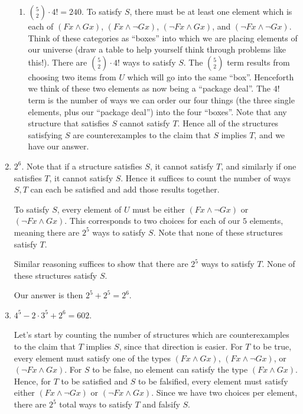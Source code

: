\begin{mdframed}[linewidth=1]
\begin{enumerate}
\begin{enumerate}
        \item $\binom{5}{2}\cdot 4! = 240$. To satisfy $S$, there must be at least one element which is each of $(Fx \land Gx)$, $(Fx \land \lnot Gx)$, $(\lnot Fx \land Gx)$, and $(\lnot Fx \land \lnot Gx)$. Think of these categories as ``boxes'' into which we are placing elements of our universe (draw a table to help yourself think through problems like this!). There are $\binom{5}{2}\cdot 4!$ ways to satisfy $S$. The $\binom{5}{2}$ term results from choosing two items from $U$ which will go into the same ``box''. Henceforth we think of these two elements as now being a ``package deal''. The $4!$ term is the number of ways we can order our four things (the three single elements, plus our ``package deal'') into the four ``boxes''. Note that any structure that satisfies $S$ cannot satisfy $T$. Hence all of the structures satisfying $S$ are counterexamples to the claim that $S$ implies $T$, and we have our answer. 
    \end{enumerate}

    \item $2^6$. Note that if a structure satisfies $S$, it cannot satisfy $T$, and similarly if one satisfies $T$, it cannot satisfy $S$. Hence it suffices to count the number of ways $S, T$ can each be satisfied and add those results together.

    To satisfy $S$, every element of $U$ must be either $(Fx \land \lnot Gx)$ or $(\lnot Fx \land Gx)$. This corresponds to two choices for each of our $5$ elements, meaning there are $2^5$ ways to satisfy $S$. Note that none of these structures satisfy $T$.

    Similar reasoning suffices to show that there are $2^5$ ways to satisfy $T$. None of these structures satisfy $S$.

    Our answer is then $2^5 + 2^5 = 2^6$. 

    \item $4^5 - 2\cdot 3^5 + 2^6 = 602$. 

    Let's start by counting the number of structures which are counterexamples to the claim that $T$ implies $S$, since that direction is easier. For $T$ to be true, every element must satisfy one of the types $(Fx \land Gx)$, $(Fx \land \lnot Gx)$, or $(\lnot Fx \land Gx)$. For $S$ to be false, no element can satisfy the type $(Fx \land Gx)$. Hence, for $T$ to be satisfied and $S$ to be falsified, every element must satisfy either $(Fx \land \lnot Gx)$ or $(\lnot Fx \land Gx)$. Since we have two choices per element, there are $2^5$ total ways to satisfy $T$ and falsify $S$. 


\end{enumerate}
\end{mdframed}
